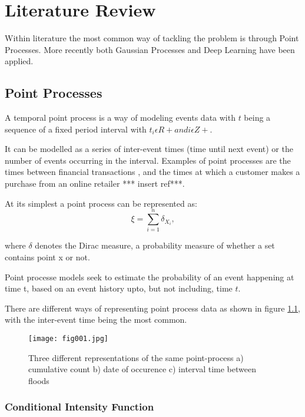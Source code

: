 
\chapter{Literature Review} %

\label{Chapter2} %

Within literature the most common way of tackling the problem is through Point Processes. More recently both Gaussian Processes and Deep Learning have been applied.

\section{Point Processes}
A temporal point process \parencite{DaleyJones} is a way of modeling events data with $t$ being a sequence of a fixed period interval with $t_i \epsilon R + and i \epsilon Z+$. 

It can be modelled as a series of inter-event times (time until next event) or the number of events occurring in the interval. Examples of point processes are the times between financial transactions \parencite{EngleRusell}, and the times at which a customer makes a purchase from an online retailer *** insert ref***.

At its simplest a point process can be represented as:
$${\xi =\sum _{i=1}^{n}\delta _{X_{i}},}$$

where $\delta$ denotes the Dirac measure, a probability measure of whether a set contains point x or not.

Point processe models seek to estimate the probability of an event happening at time t, based on an event history upto, but not including, time $t$. 

There are different ways of representing point process data as shown in figure \ref{fig:fig1}, with the inter-event time being the most common. 

\begin{figure}[h!]
	\texttt{[image: fig001.jpg]}
	\caption{Three different representations of the same point-process a) cumulative count b) date of occurence c) interval time between floods}
	\label{fig:fig1}
\end{figure}


\subsection{Conditional Intensity Function}

